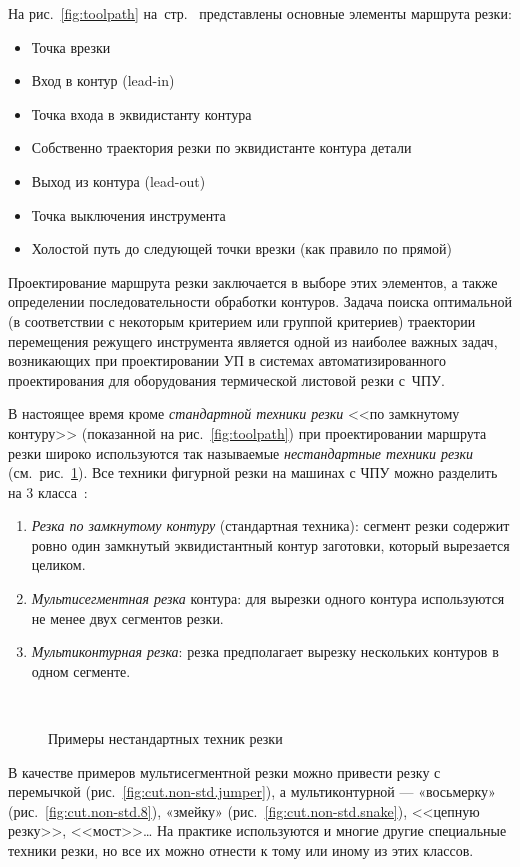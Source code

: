 На рис.~\ref{fig:toolpath}
на~стр.~\pageref{fig:toolpath}
представлены основные элементы маршрута резки:
\begin{itemize}
  \item Точка врезки
  \item Вход в контур (lead-in)
  \item Точка входа в эквидистанту контура
  \item Собственно траектория резки по эквидистанте контура детали
  \item Выход из контура (lead-out)
  \item Точка выключения инструмента
  \item Холостой путь до следующей точки врезки
  (как правило по прямой)
\end{itemize}

Проектирование маршрута резки заключается в выборе
этих элементов,
а также определении последовательности обработки контуров.
Задача поиска оптимальной
(в соответствии с некоторым критерием или группой критериев)
траектории перемещения режущего
инструмента является одной из наиболее
важных задач, возникающих при проектировании УП
в системах автоматизированного проектирования для
оборудования термической листовой резки
с~ЧПУ.

В настоящее время кроме \textit{стандартной техники резки}
<<по замкнутому контуру>>
(показанной на рис.~\ref{fig:toolpath})
при проектировании маршрута резки широко используются
так называемые
\textit{нестандартные техники резки}
(см.~рис.~\ref{fig:cut.non-std}).
Все техники фигурной резки на
машинах с ЧПУ можно разделить на 3 класса~\cite{bi:Petunin2015}:
\begin{enumerate}
  \item \textit{Резка по замкнутому контуру}
  (стандартная техника):
  сегмент резки содержит ровно один замкнутый эквидистантный контур
  заготовки, который вырезается целиком.
  \item \textit{Мультисегментная резка} контура:
  для вырезки одного
  контура используются не менее двух сегментов резки.
  \item \textit{Мультиконтурная резка}:
  резка предполагает вырезку нескольких контуров в одном сегменте.
\end{enumerate}

\begin{figure}
  \centering
  \\
  \caption{Примеры нестандартных техник резки}
  \label{fig:cut.non-std}
\end{figure}

В качестве примеров
мультисегментной
резки можно привести
резку с перемычкой
(рис.~\ref{fig:cut.non-std.jumper}),
а мультиконтурной ---
«восьмерку»
(рис.~\ref{fig:cut.non-std.8}),
«змейку»
(рис.~\ref{fig:cut.non-std.snake}),
<<цепную резку>>, <<мост>>\dots
На практике используются и многие другие специальные техники резки,
но все их можно отнести к тому или иному из этих классов.
